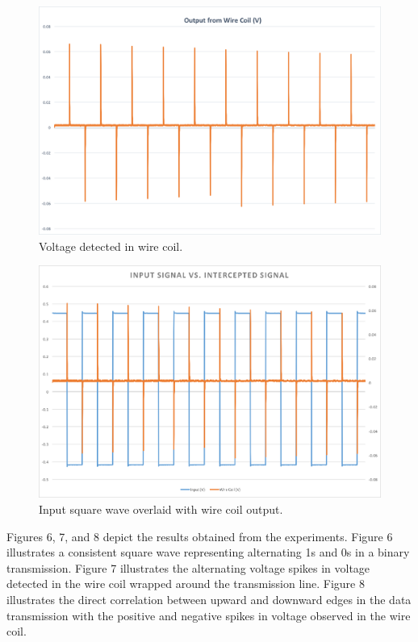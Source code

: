\documentclass{article}
\begin{document}
\begin{figure}
	\includegraphics[width=\linewidth]{images/coil.png}
	\caption{Voltage detected in wire coil.}
	\label{fig:output}
\end{figure}

\begin{figure}
	\includegraphics[width=\linewidth]{images/combined.png}
	\caption{Input square wave overlaid with wire coil output.}
	\label{fig:combined}
\end{figure}

Figures 6, 7, and 8 depict the results obtained from the experiments. Figure 6 illustrates a consistent square wave representing alternating 1s and 0s in a binary transmission. Figure 7 illustrates the alternating voltage spikes in voltage detected in the wire coil wrapped around the transmission line. Figure 8 illustrates the direct correlation between upward and downward edges in the data transmission with the positive and negative spikes in voltage observed in the wire coil.
\end{document}
